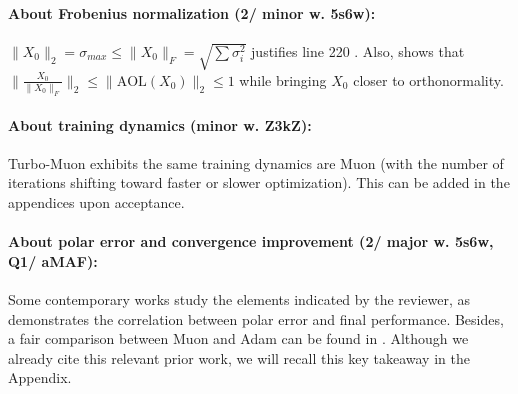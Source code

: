 \vspace{-4mm}
\paragraph{About Frobenius normalization (2/ minor w. 5s6w):} 
$\| X_0\|_2 = \sigma_{max}\leq \|X_0 \|_F=\sqrt{\sum\sigma_i^2}$  justifies line 220
. Also, \cite{rebb_prach2022almost} shows that $\|\frac{X_0}{\|X_0\|_F}\|_2 \leq \|\text{AOL}(X_0)\|_2 \leq 1$ while bringing $X_0$ closer to orthonormality.


\vspace{-4mm}
\paragraph{About training dynamics (minor w. Z3kZ):} Turbo-Muon exhibits the same training dynamics are Muon (with the number of iterations shifting toward faster or slower optimization). This can be added in the appendices upon acceptance.

\vspace{-4mm}
\paragraph{About polar error and convergence improvement
(2/ major w. 5s6w, Q1/ aMAF):} Some contemporary works study the elements indicated by the reviewer, as \cite{rebb_shulgin2025beyond} demonstrates the correlation between polar error and final performance. Besides, a fair comparison between Muon and Adam can be found in \cite{rebb_wen_fantastic_2025}. Although we already cite this relevant prior work, we will recall this key takeaway in the Appendix. %

